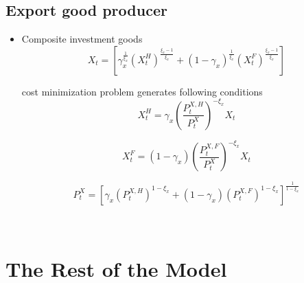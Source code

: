 \documentclass[11pt, a4paper]{article}
\begin{document}
\subsection {Export good producer}
\begin{itemize}
\item Composite investment goods
\[X_t = \left[\gamma_x ^{\frac{1}{\xi_x}} (X_t^H )^{\frac{\xi_x -1}{\xi_x}} +(1-\gamma_x) ^{\frac{1}{\xi_x}} (X_t^F )^{\frac{\xi_x -1}{\xi_x}}  \right] \]


cost minimization problem generates following conditions \\
\begin{equation}
X_t^H = \gamma_x \left(\frac{P_t^{X,H}}{P_t^X}  \right) ^{-\xi_x} X_t
\end{equation}

\begin{equation} X_t^F = (1-\gamma_x ) \left(\frac{P_t^{X,F}}{P_t^X}  \right) ^{-\xi_x} X_t \end{equation}

\begin{equation}P_t^X = \left[ \gamma_x ({P_t^{X,H}})^{1-\xi_x} +(1-\gamma_x) {(P_t^{X,F})}^{{1-\xi_x}}  \right]  ^{\frac{1}{1-\xi_x}} \end{equation}
\end{itemize}~\\


\section {The Rest of the Model}
\end{document}
